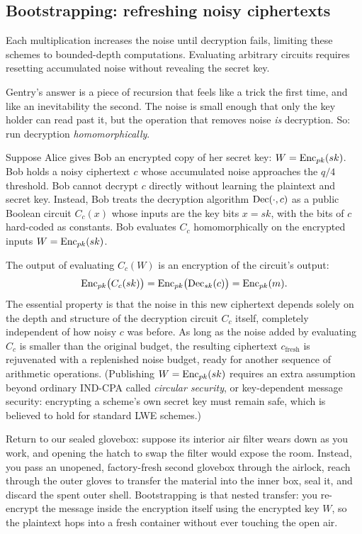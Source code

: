 \subsection{Bootstrapping: refreshing noisy ciphertexts}
\label{ch33:bootstrapping}

Each multiplication increases the noise until decryption fails, limiting these schemes to bounded-depth computations. Evaluating arbitrary circuits requires resetting accumulated noise without revealing the secret key.

Gentry's answer is a piece of recursion that feels like a trick the first time, and like an inevitability the second. The noise is small enough that only the key holder can read past it, but the operation that removes noise \emph{is} decryption. So: run decryption \emph{homomorphically}.

\begin{whybox}
Suppose Alice gives Bob an encrypted copy of her secret key: $W = \operatorname{Enc}_{pk}(sk)$. Bob holds a noisy ciphertext $c$ whose accumulated noise approaches the $q/4$ threshold. Bob cannot decrypt $c$ directly without learning the plaintext and secret key. Instead, Bob treats the decryption algorithm $\operatorname{Dec}(\cdot, c)$ as a public Boolean circuit $C_c(x)$ whose inputs are the key bits $x = sk$, with the bits of $c$ hard-coded as constants. Bob evaluates $C_c$ homomorphically on the encrypted inputs $W = \operatorname{Enc}_{pk}(sk)$.

The output of evaluating $C_c(W)$ is an encryption of the circuit's output:
\[
  \operatorname{Enc}_{pk}\bigl(C_c(sk)\bigr) = \operatorname{Enc}_{pk}\bigl(\operatorname{Dec}_{sk}(c)\bigr) = \operatorname{Enc}_{pk}(m) .
\]
The essential property is that the noise in this new ciphertext depends solely on the depth and structure of the decryption circuit $C_c$ itself, completely independent of how noisy $c$ was before. As long as the noise added by evaluating $C_c$ is smaller than the original budget, the resulting ciphertext $c_{\text{fresh}}$ is rejuvenated with a replenished noise budget, ready for another sequence of arithmetic operations. (Publishing $W = \operatorname{Enc}_{pk}(sk)$ requires an extra assumption beyond ordinary IND-CPA called \emph{circular security}, or key-dependent message security: encrypting a scheme's own secret key must remain safe, which is believed to hold for standard LWE schemes.)
\end{whybox}

\begin{intuitionbox}
Return to our sealed glovebox: suppose its interior air filter wears down as you work, and opening the hatch to swap the filter would expose the room. Instead, you pass an unopened, factory-fresh second glovebox through the airlock, reach through the outer gloves to transfer the material into the inner box, seal it, and discard the spent outer shell. Bootstrapping is that nested transfer: you re-encrypt the message inside the encryption itself using the encrypted key $W$, so the plaintext hops into a fresh container without ever touching the open air.
\end{intuitionbox}

